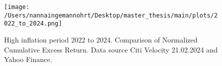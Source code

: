 \begin{figure}[H]
    \centering
    \texttt{[image: /Users/nannaingemannohrt/Desktop/master\_thesis/main/plots/2022\_to\_2024.png]}
    \caption{High inflation period 2022 to 2024. Comparison of Normalized Cumulative Excess Return. Data source Citi Velocity 21.02.2024 
    and Yahoo Finance.}
    \label{fig:2022_2024}
\end{figure}
\noindent

